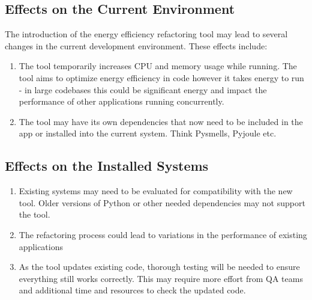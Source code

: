 \documentclass[12pt]{article}
\begin{document}
\subsection{Effects on the Current Environment}
The introduction of the energy efficiency refactoring tool may lead
to several changes in the current development environment. These
effects include:
\begin{enumerate}
  \item The tool temporarily increases CPU and memory usage while
    running. The tool aims to optimize energy efficiency in code
    however it takes energy to run - in large codebases this could be
    significant energy and impact the performance of other
    applications running concurrently.
  \item The tool may have its own dependencies that now need to be
    included in the app or installed into the current system. Think
    Pysmells, Pyjoule etc.
\end{enumerate}

\subsection{Effects on the Installed Systems}
\begin{enumerate}
  \item Existing systems may need to be evaluated for compatibility
    with the new tool. Older versions of Python or other needed
    dependencies may not support the tool.
  \item The refactoring process could lead to variations in the
    performance of existing applications
  \item As the tool updates existing code, thorough testing will be
    needed to ensure everything still works correctly. This may
    require more effort from QA teams and additional time and
    resources to check the updated code.
\end{enumerate}
\end{document}
